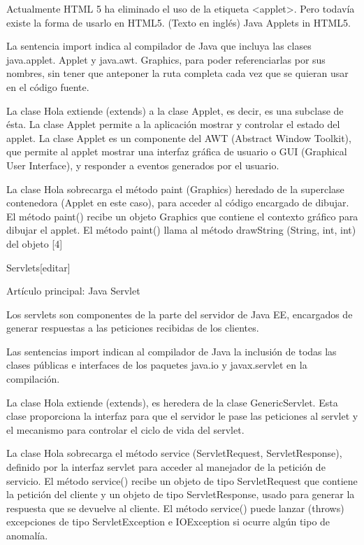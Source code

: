 \documentclass[11pt,a4paper]{book}
\begin{document}
	\bigskip
							Actualmente HTML 5 ha eliminado el uso de la etiqueta <applet>. Pero todavía existe la forma de usarlo en HTML5. (Texto en inglés) Java Applets in HTML5.
	\bigskip
							
	\bigskip
							La sentencia import indica al compilador de Java que incluya las clases java.applet. Applet y java.awt. Graphics, para poder referenciarlas por sus nombres, sin tener que anteponer la ruta completa cada vez que se quieran usar en el código fuente.
	\bigskip
							
	\bigskip
							La clase Hola extiende (extends) a la clase Applet, es decir, es una subclase de ésta. La clase Applet permite a la aplicación mostrar y controlar el estado del applet. La clase Applet es un componente del AWT (Abstract Window Toolkit), que permite al applet mostrar una interfaz gráfica de usuario o GUI (Graphical User Interface), y responder a eventos generados por el usuario.
	\bigskip
							
	\bigskip
							La clase Hola sobrecarga el método paint (Graphics) heredado de la superclase contenedora (Applet en este caso), para acceder al código encargado de dibujar. El método paint() recibe un objeto Graphics que contiene el contexto gráfico para dibujar el applet. El método paint() llama al método drawString (String, int, int) del objeto [4]
	\bigskip
							
	\bigskip
							Servlets[editar]
	\bigskip
							
	\bigskip
							Artículo principal: Java Servlet
	\bigskip
							
	\bigskip
							Los servlets son componentes de la parte del servidor de Java EE, encargados de generar respuestas a las peticiones recibidas de los clientes.
	\bigskip
							
	\bigskip
							Las sentencias import indican al compilador de Java la inclusión de todas las clases públicas e interfaces de los paquetes java.io y javax.servlet en la compilación.
	\bigskip
							
	\bigskip
							La clase Hola extiende (extends), es heredera de la clase GenericServlet. Esta clase proporciona la interfaz para que el servidor le pase las peticiones al servlet y el mecanismo para controlar el ciclo de vida del servlet.
	\bigskip
							
	\bigskip
							La clase Hola sobrecarga el método service (ServletRequest, ServletResponse), definido por la interfaz servlet para acceder al manejador de la petición de servicio. El método service() recibe un objeto de tipo ServletRequest que contiene la petición del cliente y un objeto de tipo ServletResponse, usado para generar la respuesta que se devuelve al cliente. El método service() puede lanzar (throws) excepciones de tipo ServletException e IOException si ocurre algún tipo de anomalía.
	\bigskip
							
\end{document}
